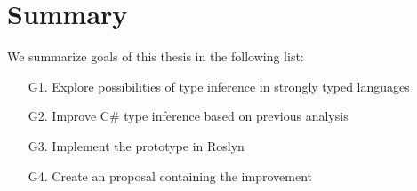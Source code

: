 \section{Summary}

We summarize goals of this thesis in the following list:

\begin{enumerate}
  \item[G1.] Explore possibilities of type inference in strongly typed languages
  \item[G2.] Improve C\# type inference based on previous analysis
  \item[G3.] Implement the prototype in Roslyn
  \item[G4.] Create an proposal containing the improvement
\end{enumerate}